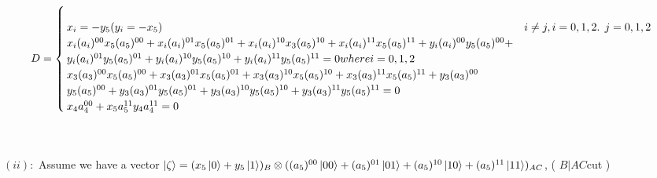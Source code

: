\documentclass[a4paper,12pt]{article}
\begin{document}
 \begin{equation}
 D=\begin{cases}
 \newline \\
 x_{i}=-y_{5}    (  y_{i}=-x_{5})        &  i\neq j   ,i=0,1,2 $. $ j=0,1,2\\
 \newline 
 x_{i}(a_{i})^{00}x_{5}(a_{5})^{00}+x_{i}(a_{i})^{01}x_{5}(a_{5})^{01}+x_{i}(a_{i})^{10}x_{3}
 (a_{5})^{10}+x_{i}(a_{i})^{11}x_{5}(a_{5})^{11}+y_{i}(a_{i})^{00}y_{5}(a_{5})^{00}+\\y_{i}(a_{i})^{01}y_{5}(a_{5})^{01}+y_{i}(a_{i})^{10}y_{5}(a_{5})^{10}+y_{i}(a_{i})^{11}y_{5}(a_{5})^{11}=0  where i=0,1,2
 \newline \\
 x_{3}(a_{3})^{00}x_{5}(a_{5})^{00}+x_{3}(a_{3})^{01}x_{5}(a_{5})^{01}+x_{3}(a_{3})^{10}x_{5}(a_{5})^{10}+x_{3}(a_{3})^{11}x_{5}(a_{5})^{11}+y_{3}(a_{3})^{00}\\y_{5}(a_{5})^{00}+y_{3}(a_{3})^{01}y_{5}(a_{5})^{01}+y_{3}(a_{3})^{10}y_{5}(a_{5})^{10}+y_{3}(a_{3})^{11}y_{5}(a_{5})^{11}=0
 \newline\\
 x_{4}a_{4}^{00}+x_{5}a_{5}^{11}y_{4}a_{4}^{11}=0
 \end{cases}	
 \end{equation}









\leavevmode\\
\newline \\
$(ii)    :$ Assume we have a vector $\ket{\zeta}=(x_{5}\ket{0}+y_{5}\ket{1})_{B}\otimes ((a_{5})^{00}\ket{00}+(a_{5})^{01}\ket{01}+(a_{5})^{10}\ket{10}+(a_{5})^{11}\ket{11})_{AC}$,   ( $      B|AC    $cut   )
\leavevmode
\newline \\
\end{document}
